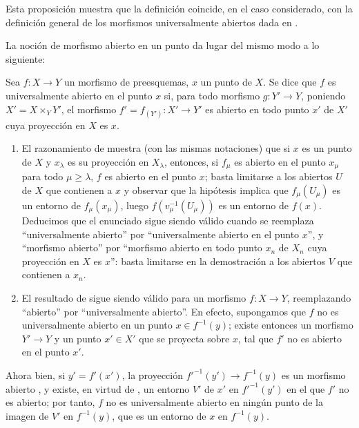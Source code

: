 Esta proposición muestra que la definición  coincide, en el caso considerado, con la definición general de los morfismos universalmente abiertos dada en .

La noción de morfismo abierto en un punto  da lugar del mismo modo a lo siguiente:

\begin{definition}[14.3.3]
\label{IV.14.3.3}
Sea $f:X\to Y$ un morfismo de preesquemas, $x$ un punto de $X$.
Se dice que $f$ es universalmente abierto en el punto $x$ si, para todo morfismo $g:Y'\to Y$, poniendo $X'=X\times_Y Y'$, el morfismo $f'=f_{(Y')}:X'\to Y'$ es abierto en todo punto $x'$ de $X'$ cuya proyección en $X$ es $x$.
\end{definition}

\begin{remarks}[14.3.3.1]
\label{IV.14.3.3.1}
\begin{enumerate}[label=(\roman*)]
  \item El razonamiento de  muestra (con las mismas notaciones) que si $x$ es un punto de $X$ y $x_\lambda$ es su proyección en $X_\lambda$, entonces, si $f_\mu$ es abierto en el punto $x_\mu$ para todo $\mu\geq\lambda$, $f$ es abierto en el punto $x$; basta limitarse a los abiertos $U$ de $X$ que contienen a $x$ y observar que la hipótesis implica que $f_\mu(U_\mu)$ es un entorno de $f_\mu(x_\mu)$, luego $f(v_\mu^{-1}(U_\mu))$ es un entorno de $f(x)$.
  Deducimos que el enunciado  sigue siendo válido cuando se reemplaza ``universalmente abierto'' por ``universalmente abierto en el punto $x$'', y ``morfismo abierto'' por ``morfismo abierto en todo punto $x_n$ de $X_n$ cuya proyección en $X$ es $x$'': basta limitarse en la demostración a los abiertos $V$ que contienen a $x_n$.

  \item El resultado de  sigue siendo válido para un morfismo $f:X\to Y$, reemplazando ``abierto'' por ``universalmente abierto''.
  En efecto, supongamos que $f$ no es universalmente abierto en un punto $x\in f^{-1}(y)$; existe entonces un morfismo $Y'\to Y$ y un punto $x'\in X'$ que se proyecta sobre $x$, tal que $f'$ no es abierto en el punto $x'$.
\end{enumerate}
\end{remarks}


Ahora bien, si $y'=f'(x')$, la proyección $f'^{-1}(y')\to f^{-1}(y)$ es un morfismo abierto , y existe, en virtud de , un entorno $V'$ de $x'$ en $f'^{-1}(y')$ en el que $f'$ no es abierto; por tanto, $f$ no es universalmente abierto en ningún punto de la imagen de $V'$ en $f^{-1}(y)$, que es un entorno de $x$ en $f^{-1}(y)$.

